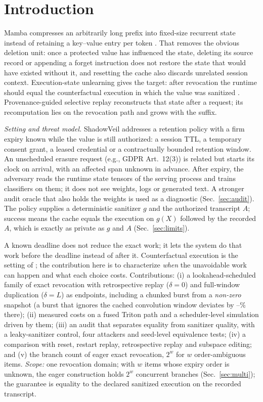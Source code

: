 \documentclass[conference]{IEEEtran}
\begin{document}
\section{Introduction}
Mamba compresses an arbitrarily long prefix into fixed-size recurrent state instead of retaining a
key--value entry per token \cite{mamba}. That removes the obvious deletion unit: once a protected value has
influenced the state, deleting its source record or appending a forget instruction does not restore the
state that would have existed without it, and resetting the cache also discards unrelated session
context. Execution-state unlearning gives the target: after revocation the runtime should equal the
counterfactual execution in which the value was sanitized \cite{executionunlearning}. Provenance-guided
selective replay reconstructs that state after a request; its recomputation lies on the revocation path and
grows with the suffix.

\emph{Setting and threat model.} ShadowVeil addresses a retention policy with a firm expiry known while the
value is still authorized: a session TTL, a temporary consent grant, a leased credential or a contractually
bounded retention window. An unscheduled erasure request (e.g., GDPR Art.~12(3)) is related but starts its
clock on arrival, with an affected span unknown in advance. After expiry, the adversary reads the runtime
state tensors of the serving process and trains classifiers on them; it does not see weights, logs or
generated text. A stronger audit oracle that also holds the weights is used as a diagnostic
(Sec.~\ref{sec:audit}). The policy supplies a deterministic sanitizer $g$ and the authorized transcript $A$;
success means the cache equals the execution on $g(X)$ followed by the recorded $A$, which is exactly as
private as $g$ and $A$ (Sec.~\ref{sec:limits}).

A known deadline does not reduce the exact work; it lets the system do that work before the deadline instead
of after it. Counterfactual execution is the setting of \cite{executionunlearning,attriguard}; the contribution here is to characterize \emph{when} the unavoidable work
can happen and what each choice costs. Contributions: (i) a lookahead-scheduled family of exact revocation
with retrospective replay ($\delta{=}0$) and full-window duplication ($\delta{=}L$) as endpoints, including a
chunked burst from a \emph{non-zero} snapshot (a burst that ignores the cached convolution window deviates by \nKOneNaiveLoB{}--\nKOneNaiveHiA\% there);
(ii) measured costs on a fused Triton path and a scheduler-level simulation driven by them; (iii) an audit
that separates equality from sanitizer quality, with a leaky-sanitizer control, four attackers and
seed-level equivalence tests; (iv) a comparison with reset, restart replay, retrospective replay and
subspace editing; and (v) the branch count of eager exact revocation, $2^w$ for $w$ order-ambiguous items.
\emph{Scope:} one revocation domain; with $w$ items whose expiry order is unknown, the eager construction
holds $2^w$ concurrent branches (Sec.~\ref{sec:multi}); the guarantee is equality to the declared sanitized
execution on the recorded transcript.
\end{document}
